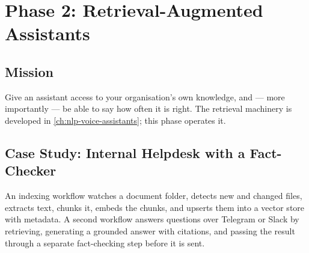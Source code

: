 \section{Phase 2: Retrieval-Augmented Assistants}

\subsection{Mission}

Give an assistant access to your organisation's own knowledge, and --- more
importantly --- be able to say how often it is right. The retrieval machinery
is developed in \cref{ch:nlp-voice-assistants}; this phase operates it.

\subsection{Case Study: Internal Helpdesk with a Fact-Checker}

An indexing workflow watches a document folder, detects new and changed files,
extracts text, chunks it, embeds the chunks, and upserts them into a vector
store with metadata. A second workflow answers questions over Telegram or Slack
by retrieving, generating a grounded answer with citations, and passing the
result through a separate fact-checking step before it is sent.

